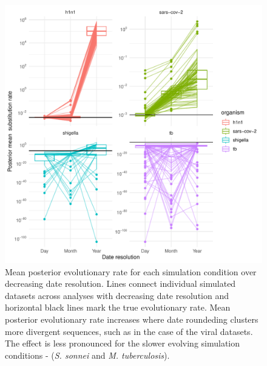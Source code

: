 \documentclass{article}
\begin{document}
\begin{spacing}{1.5}
\begin{figure}
    \centering
    \includegraphics{sim_clock_trajectory.pdf}
    \caption{Mean posterior evolutionary rate for each simulation condition over decreasing date resolution. Lines connect individual simulated datasets across analyses with decreasing date resolution and horizontal black lines mark the true evolutionary rate. Mean posterior evolutionary rate increases where date roundeding clusters more divergent sequences, such as in the case of the viral datasets. The effect is less pronounced for the slower evolving simulation conditions - (\textit{S. sonnei} and \textit{M. tuberculosis}).}
    \label{fig:simClock}
\end{figure}


\end{spacing}
\end{document}
